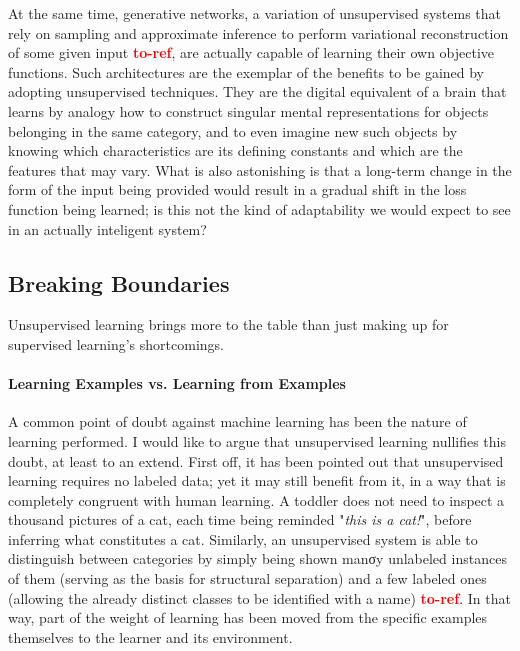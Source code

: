 \documentclass[]{article}
\newcommand\toref{\textcolor{red}{\bf{to-ref}}}
\begin{document}
At the same time, generative networks, a variation of unsupervised systems that rely on sampling and approximate inference to perform variational reconstruction of some given input \toref , are actually capable of learning their own objective functions. Such architectures are the exemplar of the benefits to be gained by adopting unsupervised techniques. They are the digital equivalent of a brain that learns by analogy how to construct singular mental representations for objects belonging in the same category, and to even imagine new such objects by knowing which characteristics are its defining constants and which are the features that may vary. What is also astonishing is that a long-term change in the form of the input being provided would result in a gradual shift in the loss function being learned; is this not the kind of adaptability we would expect to see in an actually inteligent system?

\subsection{Breaking Boundaries}
Unsupervised learning brings more to the table than just making up for supervised learning's shortcomings. 

\paragraph{Learning Examples vs. Learning from Examples} A common point of doubt against machine learning has been the nature of learning performed. I would like to argue that unsupervised learning nullifies this doubt, at least to an extend. First off, it has been pointed out that unsupervised learning requires no labeled data; yet it may still benefit from it, in a way that is completely congruent with human learning. A toddler does not need to inspect a thousand pictures of a cat, each time being reminded "\textit{this is a cat!}", before inferring what constitutes a cat. Similarly, an unsupervised system is able to distinguish between categories by simply being shown manσy unlabeled instances of them (serving as the basis for structural separation) and a few labeled ones (allowing the already distinct classes to be identified with a name) \toref . In that way, part of the weight of learning has been moved from the specific examples themselves to the learner and its environment.
\end{document}
